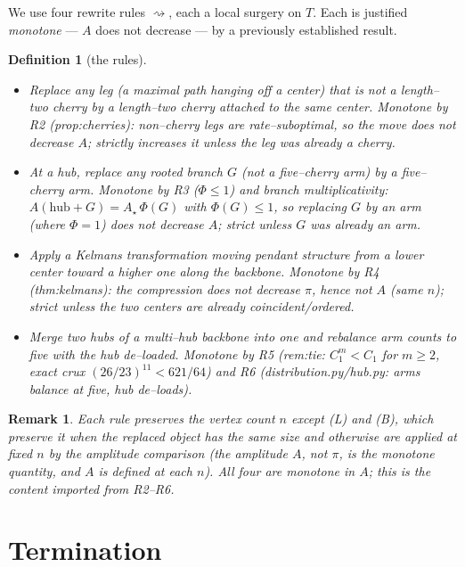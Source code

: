 \documentclass[11pt]{article}
\newtheorem{definition}[theorem]{Definition}
\newtheorem{remark}[theorem]{Remark}
\newcommand{\pit}{\pi}
\begin{document}
We use four rewrite rules $\rightsquigarrow$, each a local surgery on $T$. Each is justified
\emph{monotone} --- $A$ does not decrease --- by a previously established result.

\begin{definition}[the rules]\label{def:rules}\leavevmode
\begin{itemize}
\item[\textbf{(L) Leg$\to$cherry.} ] Replace any leg (a maximal path hanging off a center) that is not a
length--two cherry by a length--two cherry attached to the same center. \emph{Monotone by} R2
(prop:cherries): non--cherry legs are rate--suboptimal, so the move does not decrease $A$; strictly increases
it unless the leg was already a cherry.
\item[\textbf{(B) Branch$\to$arm.} ] At a hub, replace any rooted branch $G$ (not a five--cherry arm) by a
five--cherry arm. \emph{Monotone by} R3 ($\Phi\le1$) and branch multiplicativity: $A(\text{hub}+G)=A_{\star}\,
\Phi(G)$ with $\Phi(G)\le1$, so replacing $G$ by an arm (where $\Phi=1$) does not decrease $A$; strict unless
$G$ was already an arm.
\item[\textbf{(K) Kelmans compression.} ] Apply a Kelmans transformation moving pendant structure from a lower
center toward a higher one along the backbone. \emph{Monotone by} R4 (thm:kelmans): the compression does not
decrease $\pit$, hence not $A$ (same $n$); strict unless the two centers are already coincident/ordered.
\item[\textbf{(H) Hub--merge and de--load.} ] Merge two hubs of a multi--hub backbone into one and rebalance
arm counts to five with the hub de--loaded. \emph{Monotone by} R5 (rem:tie: $C_1^m<C_1$ for $m\ge2$, exact
crux $(26/23)^{11}<621/64$) and R6 (distribution.py/hub.py: arms balance at five, hub de--loads).
\end{itemize}
\end{definition}

\begin{remark}
Each rule preserves the vertex count $n$ except (L) and (B), which preserve it when the replaced object has
the same size and otherwise are applied at fixed $n$ by the amplitude comparison (the amplitude $A$, not
$\pit$, is the monotone quantity, and $A$ is defined at each $n$). All four are monotone in $A$; this is the
content imported from R2--R6.
\end{remark}

\section{Termination}
\end{document}

